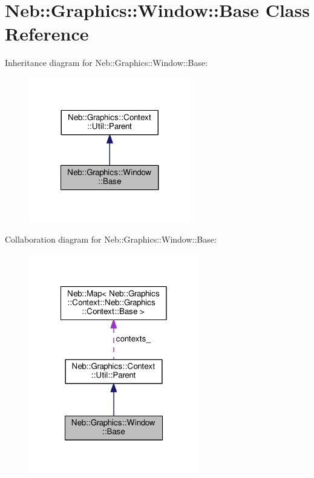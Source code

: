 \hypertarget{classNeb_1_1Graphics_1_1Window_1_1Base}{\section{Neb\-:\-:Graphics\-:\-:Window\-:\-:Base Class Reference}
\label{classNeb_1_1Graphics_1_1Window_1_1Base}
}


Inheritance diagram for Neb\-:\-:Graphics\-:\-:Window\-:\-:Base\-:
\nopagebreak
\begin{figure}[H]
\begin{center}
\leavevmode
\includegraphics[width=200pt]{classNeb_1_1Graphics_1_1Window_1_1Base__inherit__graph}
\end{center}
\end{figure}


Collaboration diagram for Neb\-:\-:Graphics\-:\-:Window\-:\-:Base\-:
\nopagebreak
\begin{figure}[H]
\begin{center}
\leavevmode
\includegraphics[width=210pt]{classNeb_1_1Graphics_1_1Window_1_1Base__coll__graph}
\end{center}
\end{figure}

